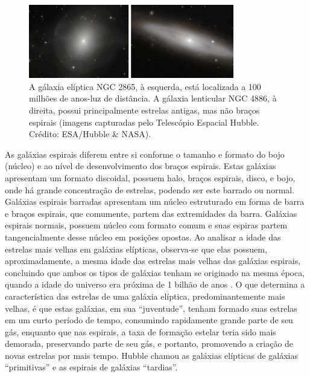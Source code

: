 \begin{figure}[h] 
  \centering 
  \includegraphics[width=0.8\textwidth]{Imagens/eliptica_lenticular.png} 
  \caption[Gálaxia elíptica NGC 2865 e gálaxia lenticular NGC 4886.]{A gálaxia elíptica NGC 2865, à esquerda, está localizada a 100 milhões de anos-luz de distância. A gálaxia lenticular NGC 4886, à direita, possui principalmente estrelas antigas, mas não braços espirais (imagens capturadas pelo Telescópio Espacial Hubble. Crédito: ESA/Hubble \& NASA).}
  \label{fig:eliptica_lenticular} 
\end{figure}

As galáxias espirais diferem entre si conforme o tamanho e formato do bojo (núcleo) e ao nível de desenvolvimento dos braços espirais. Estas galáxias apresentam um formato discoidal, possuem halo, braços espirais, disco, e bojo, onde há grande concentração de estrelas, podendo ser este barrado ou normal. Galáxias espirais barradas apresentam um núcleo estruturado em forma de barra e braços espirais, que comumente, partem das extremidades da barra. Galáxias espirais normais, possuem núcleo com formato comum e suas espiras partem tangencialmente desse núcleo em posições opostas. Ao analisar a idade das estrelas mais velhas em galáxias elípticas, observa-se que elas possuem, aproximadamente, a mesma idade das estrelas mais velhas das galáxias espirais, concluindo que ambos os tipos de galáxias tenham se originado na mesma época, quando a idade do universo era próxima de 1 bilhão de anos \cite{2023Muller}. O que determina a característica das estrelas de uma galáxia elíptica, predominantemente mais velhas, é que estas galáxias, em sua ``juventude'', tenham formado suas estrelas em um curto período de tempo, consumindo rapidamente grande parte de seu gás, enquanto que nas espirais, a taxa de formação estelar teria sido mais demorada, preservando parte de seu gás, e portanto, promovendo a criação de novas estrelas por mais tempo. Hubble chamou as galáxias elípticas de galáxias ``primitivas'' e as espirais de galáxias ``tardias''.

